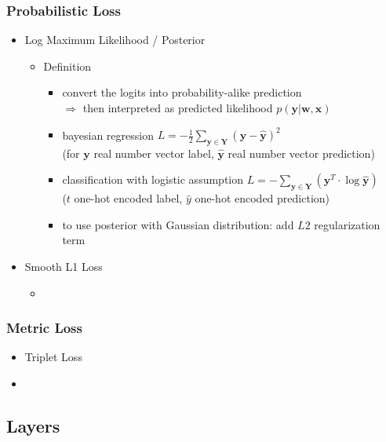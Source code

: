 \subsubsection{Probabilistic Loss}
\begin{itemize}
\item Log Maximum Likelihood / Posterior
	\begin{itemize}
	\item Definition
		\begin{itemize}
		\item convert the logits into probability-alike prediction \\ 
		$\Rightarrow$ then interpreted as predicted likelihood $p(\mathbf y|\mathbf w, \mathbf x)$
		\item bayesian regression $\displaystyle L = -\frac 1 2\sum_{\mathbf y\in \mathbf Y} (\mathbf y - \hat {\mathbf y})^2$ \\
		(for $\mathbf y$ real number vector label, $\hat {\mathbf y}$ real number vector prediction)
		\item classification with logistic assumption $\displaystyle L = -\sum_{\mathbf y\in\mathbf Y}(\mathbf y^T \cdot \log \hat {\mathbf y})$ \\
		($t$ one-hot encoded label, $\hat y$ one-hot encoded prediction)
		\item to use posterior with Gaussian distribution: add $L2$ regularization term
		\end{itemize}
	\end{itemize}

\item Smooth L1 Loss
	\begin{itemize}
	\item 
	\end{itemize}
\end{itemize}

\subsubsection{Metric Loss}
\begin{itemize}
\item Triplet Loss
\item 
\end{itemize}


\subsection{Layers}

